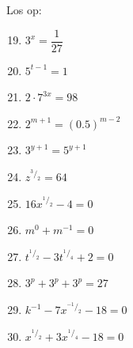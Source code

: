 \begin{eocexercises}{}
Los op:
\begin{multicols}{2}
\begin{enumerate}[noitemsep, label=\textbf{\arabic*}., itemsep=5pt]
\setcounter{enumi}{18}
\item $ 3^x = \dfrac{1}{27} $
\item $ 5^{t-1} = 1 $
\item $ 2 \cdot 7^{3x} = 98 $
\item $ 2^{m+1} = (0.5)^{m-2}$
\item $ 3^{y+1} = 5^{y+1} $
\item $ z^{^3/_2} = 64 $
\item $ 16x^{^1/_2} - 4 = 0 $
\item $ m^0 + m^{-1} = 0 $
\item $ t^{^1/_2} - 3t^{^1/_4} + 2 = 0 $
\item $ 3^p + 3^p + 3^p = 27 $
\item $ k^{-1} - 7x^{^{-1}/_2} -18 = 0 $
\item $ x^{^1/_2}+3x^{^1/_4}-18 = 0 $
\end{enumerate}
\end{multicols}


\end{eocexercises}

